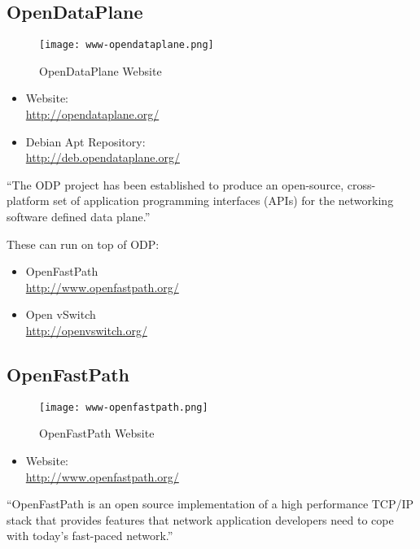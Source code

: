 \subsection{OpenDataPlane}
\begin{figure}[h!]
\texttt{[image: www-opendataplane.png]}
 \caption{OpenDataPlane Website}
 \label{fig:www-opendataplane}
\end{figure}


\begin{itemize}
 \item Website: \\ \url{http://opendataplane.org/}
 \item Debian Apt Repository: \\ \url{http://deb.opendataplane.org/}
\end{itemize}

``The ODP project has been established to produce an open-source, cross-platform set of application programming interfaces (APIs) for the networking software defined data plane.''


These can run on top of ODP:

\begin{itemize}
 \item OpenFastPath \\ \url{http://www.openfastpath.org/}
 \item Open vSwitch \\ \url{http://openvswitch.org/}
\end{itemize}


\subsection{OpenFastPath}
\begin{figure}[h!]
\texttt{[image: www-openfastpath.png]}
 \caption{OpenFastPath Website}
 \label{fig:www-openfastpath}
\end{figure}


\begin{itemize}
 \item Website: \\ \url{http://www.openfastpath.org/}
\end{itemize}


``OpenFastPath is an open source implementation of a high performance TCP/IP stack that provides features that network application developers need to cope with today’s fast-paced network.''


